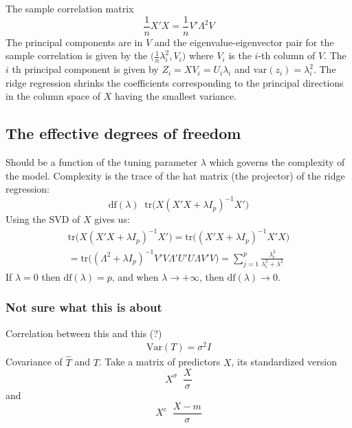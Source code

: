 \documentclass[a4paper]{article}
\newcommand{\tr}{\text{tr}}
\newcommand{\defn}{\mathop{\overset{\Delta}{=}}\nolimits}
\begin{document}
The sample correlation matrix
\[\frac{1}{n} X'X = \frac{1}{n} V'\Lambda^2 V\]
The principal components are in $V$ and the eigenvalue-eigenvector pair for the
sample correlation is given by the $\bigl(\frac{1}{n}\lambda_i^2, V_i\bigr)$
where $V_i$ is the $i$-th column of $V$. The $i$ th principal component is given
by $Z_i = X V_i = U_i \lambda_i$ and $\text{var}(z_i) = \lambda_i^2$. The ridge
regression shrinks the coefficients corresponding to the principal directions in
the column space of $X$ having the smallest variance.



\subsection*{The effective degrees of freedom} %
\label{sub:the_effective_degrees_of_freedom}

Should be a function of the tuning parameter $\lambda$ which governs the complexity
of the model. Complexity is the trace of the hat matrix (the projector) of the ridge regression:
\[\text{df}(\lambda) \defn \tr\bigl(X (X'X + \lambda I_p)^{-1} X'\bigr)\]
Using the SVD of $X$ gives us:
\begin{multline*}
\tr\bigl(X (X'X + \lambda I_p)^{-1} X'\bigr)
= \tr\bigl((X'X + \lambda I_p)^{-1} X'X \bigr) \\
= \tr\bigl( (\Lambda^2 + \lambda I_p)^{-1} V'V\Lambda' U'U\Lambda V'V\bigr)
= \sum_{j=1}^p \frac{\lambda_i^2}{\lambda_i^2 + \lambda^2}
\end{multline*}
If $\lambda = 0$ then $\text{df}(\lambda) = p$, and when $\lambda\to +\infty$,
then $\text{df}(\lambda) \to 0$.


\subsubsection*{Not sure what this is about} %
\label{ssub:not_sure_what_this_is_about}

Correlation between this and this (?)
\begin{align*}
	\text{Var}(T) = \sigma^2 I
\end{align*}
Covariance of $\hat{T}$ and $T$.
Take a matrix of predictors $X$, its standardized version
\[X^\sigma \defn \frac{X}{\sigma}\]
and \[X^c \defn \frac{X-m}{\sigma}\]
\end{document}
